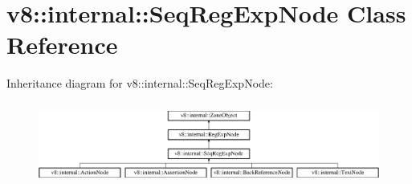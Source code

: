 \hypertarget{classv8_1_1internal_1_1_seq_reg_exp_node}{}\section{v8\+:\+:internal\+:\+:Seq\+Reg\+Exp\+Node Class Reference}
\label{classv8_1_1internal_1_1_seq_reg_exp_node}
Inheritance diagram for v8\+:\+:internal\+:\+:Seq\+Reg\+Exp\+Node\+:\begin{figure}[H]
\begin{center}
\leavevmode
\includegraphics[height=2.731707cm]{classv8_1_1internal_1_1_seq_reg_exp_node}
\end{center}
\end{figure}
